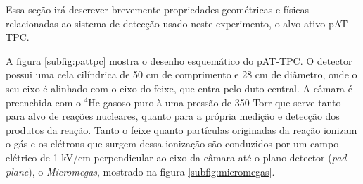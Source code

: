 \documentclass[a4paper,12pt,oneside]{book}
\begin{document}
\par Essa seção irá descrever brevemente propriedades geométricas e físicas relacionadas ao sistema de detecção usado neste experimento, o alvo ativo pAT-TPC.
\par A figura \ref{subfig:pattpc} mostra o desenho esquemático do pAT-TPC. O detector possui uma cela cilíndrica de 50 cm de comprimento e 28 cm de diâmetro, onde o seu eixo é alinhado com o eixo do feixe\cite{pattpc}, que entra pelo duto central. A câmara é preenchida com o $^4$He gasoso puro à uma pressão de 350 Torr que serve tanto para alvo de reações nucleares, quanto para a própria medição e detecção dos produtos da reação\cite{pattpc, pattpc2}. Tanto o feixe quanto partículas originadas da reação ionizam o gás e os elétrons que surgem dessa ionização são conduzidos por um campo elétrico de 1 kV/cm perpendicular ao eixo da câmara até o plano detector (\textit{pad plane}), o \textit{Micromegas}\cite{micromegas}, mostrado na figura \ref{subfig:micromegas}.
\end{document}
